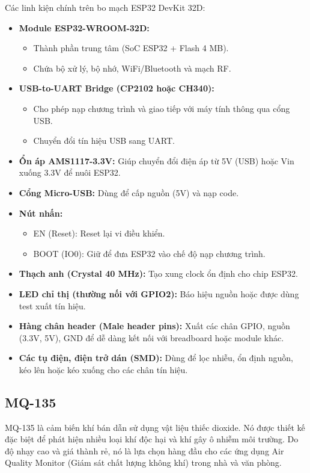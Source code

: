 \documentclass[../BTL_PTIT.tex]{subfiles}
\begin{document}
Các linh kiện chính trên bo mạch ESP32 DevKit 32D:
\begin{itemize}[label=\textbullet]
    \item \textbf{Module ESP32-WROOM-32D:}
    \begin{itemize}
        \item Thành phần trung tâm (SoC ESP32 + Flash 4 MB).
        \item Chứa bộ xử lý, bộ nhớ, WiFi/Bluetooth và mạch RF.
    \end{itemize}
    \item \textbf{USB-to-UART Bridge (CP2102 hoặc CH340):}
    \begin{itemize}
        \item Cho phép nạp chương trình và giao tiếp với máy tính thông qua cổng USB.
        \item Chuyển đổi tín hiệu USB sang UART.
    \end{itemize}
    \item \textbf{Ổn áp AMS1117-3.3V:} Giúp chuyển đổi điện áp từ 5V (USB) hoặc Vin xuống 3.3V để nuôi ESP32.
    \item \textbf{Cổng Micro-USB:} Dùng để cấp nguồn (5V) và nạp code.
    \item \textbf{Nút nhấn:}
    \begin{itemize}
        \item EN (Reset): Reset lại vi điều khiển.
        \item BOOT (IO0): Giữ để đưa ESP32 vào chế độ nạp chương trình.
    \end{itemize}
    \item \textbf{Thạch anh (Crystal 40 MHz):} Tạo xung clock ổn định cho chip ESP32.
    \item \textbf{LED chỉ thị (thường nối với GPIO2):} Báo hiệu nguồn hoặc được dùng test xuất tín hiệu.
    \item \textbf{Hàng chân header (Male header pins):} Xuất các chân GPIO, nguồn (3.3V, 5V), GND để dễ dàng kết nối với breadboard hoặc module khác.
    \item \textbf{Các tụ điện, điện trở dán (SMD):} Dùng để lọc nhiễu, ổn định nguồn, kéo lên hoặc kéo xuống cho các chân tín hiệu.
\end{itemize}

\subsection{MQ-135}
MQ-135 là cảm biến khí bán dẫn sử dụng vật liệu thiếc dioxide. Nó được thiết kế đặc biệt để phát hiện nhiều loại khí độc hại và khí gây ô nhiễm môi trường. Do độ nhạy cao và giá thành rẻ, nó là lựa chọn hàng đầu cho các ứng dụng Air Quality Monitor (Giám sát chất lượng không khí) trong nhà và văn phòng.
\end{document}
